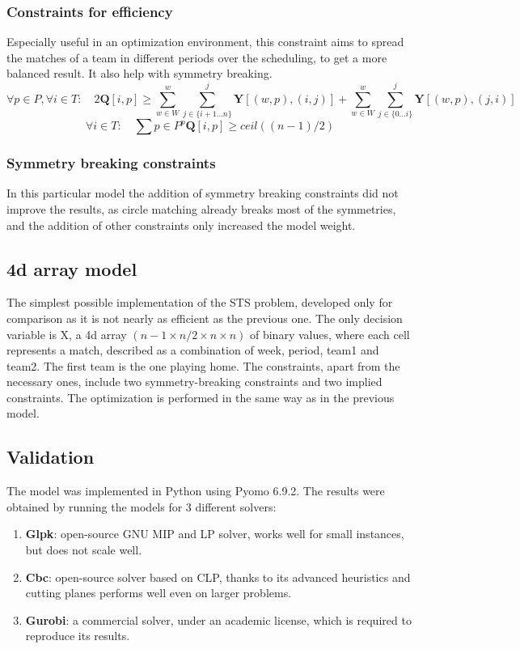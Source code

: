 \subsubsection*{Constraints for efficiency}
Especially useful in an optimization environment, this constraint aims to spread the matches of a team in different periods over the scheduling, to get a more balanced result. It also help with symmetry breaking.
\[
    \forall p \in P, \forall i \in T: \quad 2 \textbf{Q}[i,p] \geq 
    \sum_{w \in W}^{w}\sum_{j \in \{i+1\dots n\}}^{j} \textbf{Y}[(w,p), (i,j)] + 
    \sum_{w \in W}^{w}\sum_{j \in \{0\dots i\}}^{j} \textbf{Y}[(w,p), (j,i)]
\]
\[
    \forall i \in T: \quad \sum{p \in P}^p \textbf{Q}[i,p] \geq ceil((n-1)/2)
\]
\subsubsection*{Symmetry breaking constraints}
In this particular model the addition of symmetry breaking constraints did not improve the results, as circle matching already breaks most of the symmetries, and the addition of other constraints only increased the model weight.

\subsection{4d array model}
The simplest possible implementation of the STS problem, developed only for comparison as it is not nearly as efficient as the previous one.
The only decision variable is X, a 4d array $(n-1 \times n/2 \times n \times n)$ of binary values, where each cell represents a match, described as a combination of week, period, team1 and team2. The first team is the one playing home.
The constraints, apart from the necessary ones, include two symmetry-breaking constraints and two implied constraints.
The optimization is performed in the same way as in the previous model.

\subsection{Validation}
The model was implemented in Python using Pyomo 6.9.2. 
The results were obtained by running the models for 3 different solvers:
\begin{enumerate}
    \item \textbf{Glpk}: open-source GNU MIP and LP solver, works well for small instances, but does not scale well.
    \item \textbf{Cbc}: open-source solver based on CLP, thanks to its advanced heuristics and cutting planes performs well even on larger problems.
    \item \textbf{Gurobi}: a commercial solver, under an academic license, which is required to reproduce its results.
\end{enumerate}

